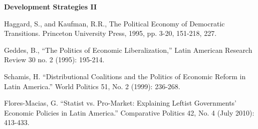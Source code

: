 \documentclass[letterpaper]{article}
\renewenvironment{itemize}{
  \begin{list}{}{
    \setlength{\leftmargin}{1.5em}
  }
}{
  \end{list}
}
\begin{document}
\begin{enumerate}
\item {\bf Development Strategies II}
	\begin{itemize}
		\item[$\bullet$] Haggard, S., and Kaufman, R.R., The Political Economy of Democratic Transitions. Princeton University Press, 1995, pp. 3-20, 151-218, 227.
		\item[$\bullet$] Geddes, B., ``The Politics of Economic Liberalization,'' Latin American Research Review 30 no. 2 (1995): 195-214.
		\item[$\bullet$] Schamis, H. ``Distributional Coalitions and the Politics of Economic Reform in Latin America.'' World Politics 51, No. 2 (1999): 236-268.
		\item[$\bullet$] Flores-Macias, G. ``Statist vs. Pro-Market: Explaining Leftist Governments' Economic Policies in Latin America.'' Comparative Politics 42, No. 4 (July 2010): 413-433.
	\end{itemize}



\end{enumerate}
\end{document}
